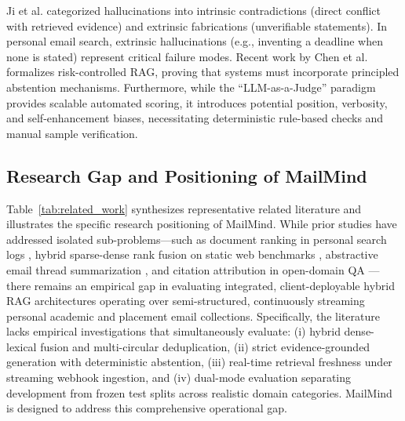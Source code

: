 \documentclass[11pt,a4paper]{article}
\begin{document}
Ji et al. \cite{ji2023survey} categorized hallucinations into intrinsic contradictions (direct conflict with retrieved evidence) and extrinsic fabrications (unverifiable statements). In personal email search, extrinsic hallucinations (e.g., inventing a deadline when none is stated) represent critical failure modes. Recent work by Chen et al. \cite{chen2024controlling} formalizes risk-controlled RAG, proving that systems must incorporate principled abstention mechanisms. Furthermore, while the ``LLM-as-a-Judge'' paradigm \cite{zheng2023judging} provides scalable automated scoring, it introduces potential position, verbosity, and self-enhancement biases, necessitating deterministic rule-based checks and manual sample verification.

\subsection{Research Gap and Positioning of MailMind}
Table~\ref{tab:related_work} synthesizes representative related literature and illustrates the specific research positioning of MailMind. While prior studies have addressed isolated sub-problems—such as document ranking in personal search logs \cite{bendersky2017learning, bendersky2020search}, hybrid sparse-dense rank fusion on static web benchmarks \cite{cormack2009reciprocal, yang2024cluster}, abstractive email thread summarization \cite{zhang2021emailsum}, and citation attribution in open-domain QA \cite{gao2023enabling, qi2024model}—there remains an empirical gap in evaluating integrated, client-deployable hybrid RAG architectures operating over semi-structured, continuously streaming personal academic and placement email collections. Specifically, the literature lacks empirical investigations that simultaneously evaluate: (i) hybrid dense-lexical fusion and multi-circular deduplication, (ii) strict evidence-grounded generation with deterministic abstention, (iii) real-time retrieval freshness under streaming webhook ingestion, and (iv) dual-mode evaluation separating development from frozen test splits across realistic domain categories. MailMind is designed to address this comprehensive operational gap.
\end{document}
